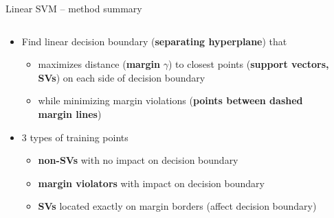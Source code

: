 \begin{vbframe}{Linear SVM -- method summary}

   
\medskip



\begin{columns}[T]
\begin{column}{0.7\linewidth}
    
\begin{itemize}
\item Find linear decision boundary (\textbf{separating hyperplane}) that 
\begin{itemize}
    \item maximizes distance (\textbf{margin} $\gamma$) to closest points (\textbf{support vectors, SVs}) on each side of decision boundary
    \item while minimizing margin violations (\textbf{points between dashed margin lines})
\end{itemize}
  \item 3 types of training points
  \begin{itemize}
    \item \textbf{non-SVs} with no impact on decision boundary
    \item \textbf{margin violators} with impact on decision boundary
    \item \textbf{SVs} located exactly on margin borders (affect decision boundary)
  \end{itemize}
\end{itemize}
\end{column}
\begin{column}{0.3\linewidth}
    

\end{column}
\end{columns}
\end{vbframe}
